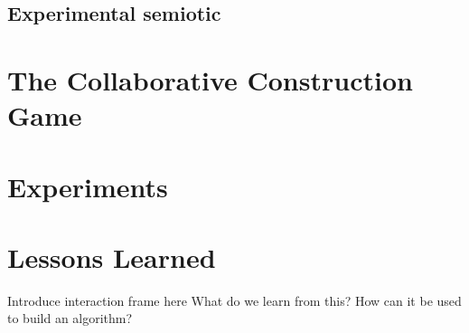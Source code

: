\subsection{Experimental semiotic}

\section{The Collaborative Construction Game}

\section{Experiments}

\section{Lessons Learned}

Introduce interaction frame here
What do we learn from this? 
How can it be used to build an algorithm?




